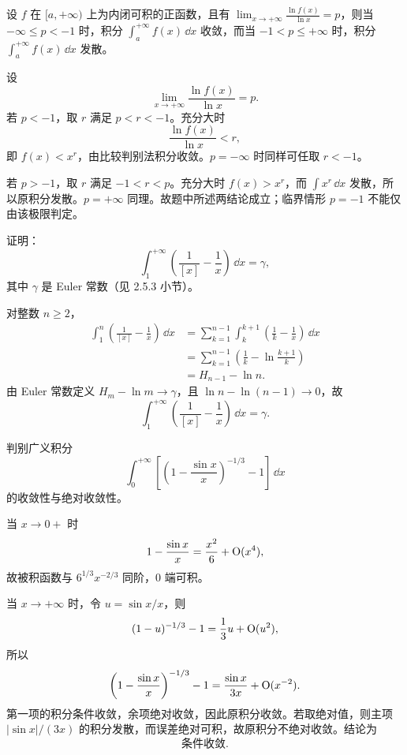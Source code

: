 \begin{xreferenceproblem}[6]
设 $f$ 在 $[a,+\infty)$ 上为内闭可积的正函数，且有 $\lim_{x\to+\infty}\frac{\ln f(x)}{\ln x}=p$，则当 $-\infty\leq p<-1$ 时，积分 $\int_a^{+\infty}f(x)\,\dd x$ 收敛，而当 $-1<p\leq+\infty$ 时，积分 $\int_a^{+\infty}f(x)\,\dd x$ 发散。
\end{xreferenceproblem}
\begin{xsolution}
设
\[
  \lim_{x\to+\infty}\frac{\ln f(x)}{\ln x}=p.
\]
若 $p<-1$，取 $r$ 满足 $p<r<-1$。充分大时
\[
  \frac{\ln f(x)}{\ln x}<r,
\]
即 $f(x)<x^r$，由比较判别法积分收敛。$p=-\infty$ 时同样可任取 $r<-1$。

若 $p>-1$，取 $r$ 满足 $-1<r<p$。充分大时 $f(x)>x^r$，而 $\int x^r\,\dd x$ 发散，所以原积分发散。$p=+\infty$ 同理。故题中所述两结论成立；临界情形 $p=-1$ 不能仅由该极限判定。
\end{xsolution}


\begin{xreferenceproblem}[7]
证明：
  \[
    \int_1^{+\infty}\left(\frac1{[x]}-\frac1x\right)\,\dd x=\gamma,
  \]
  其中 $\gamma$ 是 Euler 常数（见 2.5.3 小节）。
\end{xreferenceproblem}
\begin{xsolution}
对整数 $n\geq2$，
\begin{align*}
  \int_1^n\left(\frac1{[x]}-\frac1x\right)\,\dd x
  &=\sum_{k=1}^{n-1}\int_k^{k+1}\left(\frac1k-\frac1x\right)\,\dd x\\
  &=\sum_{k=1}^{n-1}\left(\frac1k-\ln\frac{k+1}{k}\right)\\
  &=H_{n-1}-\ln n.
\end{align*}
由 Euler 常数定义 $H_m-\ln m\to\gamma$，且 $\ln n-\ln(n-1)\to0$，故
\[
  \boxed{\int_1^{+\infty}\left(\frac1{[x]}-\frac1x\right)\,\dd x=\gamma}.
\]
\end{xsolution}


\begin{xreferenceproblem}[8]
判别广义积分
  \[
    \int_0^{+\infty}\left[\left(1-\frac{\sin x}{x}\right)^{-1/3}-1\right]\,\dd x
  \]
  的收敛性与绝对收敛性。
\end{xreferenceproblem}
\begin{xsolution}
当 $x\to0+$ 时
\[
  1-\frac{\sin x}{x}=\frac{x^2}{6}+\mathrm{O}(x^4),
\]
故被积函数与 $6^{1/3}x^{-2/3}$ 同阶，$0$ 端可积。

当 $x\to+\infty$ 时，令 $u=\sin x/x$，则
\[
  (1-u)^{-1/3}-1=\frac13u+\mathrm{O}(u^2),
\]
所以
\[
  \left(1-\frac{\sin x}{x}\right)^{-1/3}-1
  =\frac{\sin x}{3x}+\mathrm{O}(x^{-2}).
\]
第一项的积分条件收敛，余项绝对收敛，因此原积分收敛。若取绝对值，则主项 $|\sin x|/(3x)$ 的积分发散，而误差绝对可积，故原积分不绝对收敛。结论为
\[
  \boxed{\text{条件收敛}}.
\]
\end{xsolution}


